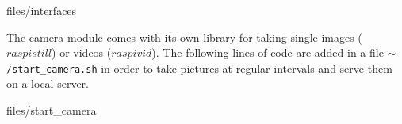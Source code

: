 \begin{center}
\begin{minipage}{0.9\linewidth}
    \begin{lstinputlisting}[caption=\texttt{/etc/network/interfaces}., label=interfaces, frame=none]
        {files/interfaces}
\end{lstinputlisting}
\end{minipage}
\end{center}

The camera module comes with its own library for taking single images ($raspistill$) or videos ($raspivid$).
The following lines of code are added in a file \texttt{$\sim$/start\_camera.sh} in order to take pictures at regular intervals and serve them on a local server. 
\begin{center}
\begin{minipage}{0.9\linewidth}
\begin{lstinputlisting}[caption=\texttt{$\sim$/start\_camera.sh}., label=startcamera, frame=none]
    {files/start_camera}
\end{lstinputlisting}
\end{minipage}
\end{center}


